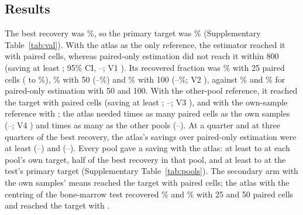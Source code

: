 \subsection*{Results}
The best recovery was \VlLevel\%, so the primary target was \VlTarget\% (Supplementary Table~\ref{tab:val}). With the atlas as the only reference, the estimator reached it with \VlCellsAtlas{} paired cells, whereas paired-only estimation did not reach it within 800 (saving at least \VlSaveAtlas; 95\% CI, \VlSaveAtlasLo--\VlSaveAtlasHi; V1 \VlVOne). Its recovered fraction was \VlRfAtlasTwentyFive\% with 25 paired cells (\VlRfAtlasTwentyFiveLo{} to \VlRfAtlasTwentyFiveHi\%), \VlRfAtlasFifty\% with 50 (\VlRfAtlasFiftyLo--\VlRfAtlasFiftyHi\%) and \VlRfAtlasHundred\% with 100 (\VlRfAtlasHundredLo--\VlRfAtlasHundredHi\%; V2 \VlVTwo), against \VlRfPairedFifty\% and \VlRfPairedHundred\% for paired-only estimation with 50 and 100. With the other-pool reference, it reached the target with \VlCellsOther{} paired cells (saving at least \VlSaveOther; \VlSaveOtherLo--\VlSaveOtherHi; V3 \VlVThree), and with the own-sample reference with \VlCellsOwn; the atlas needed \VlAtlasOverOwn{} times as many paired cells as the own samples (\VlAtlasOverOwnLo--\VlAtlasOverOwnHi; V4 \VlVFour) and \VlAtlasOverOther{} times as many as the other pools (\VlAtlasOverOtherLo--\VlAtlasOverOtherHi). At a quarter and at three quarters of the best recovery, the atlas's savings over paired-only estimation were at least \VlSaveAtlasQuarter{} (\VlSaveAtlasQuarterLo--\VlSaveAtlasQuarterHi) and \VlSaveAtlasThreeQ{} (\VlSaveAtlasThreeQLo--\VlSaveAtlasThreeQHi). Every pool gave a saving with the atlas: at least \VlPoolMin{} to \VlPoolMax{} at each pool's own target, half of the best recovery in that pool, and at least \RbPoolMin{} to \RbPoolMax{} at the test's primary target (Supplementary Table~\ref{tab:pools}). The secondary arm with the own samples' means reached the target with \VlCellsOwnPool{} paired cells; the atlas with the centring of the bone-marrow test recovered \VlRfDfTwentyFive\% and \VlRfDfFifty\% with 25 and 50 paired cells and reached the target with \VlCellsDf.

\begin{table}[h]
\caption{\textbf{Validation test: recovered fraction of within-cell-type dependence by reference.} Pooled over the \VlNFolds{} held-out samples; recovered fraction (\%) at each budget of paired cells, averaged over five draws, and paired cells needed to reach the primary target (\VlTarget\%, half of the best recovery), interpolated on the running maximum of each curve. Paired cells were centred within their populations by contrasts in every arm except the last two: own samples, their averages, centred on the population averages of the own-sample reference; atlas, centred as in bone marrow, centred on their own population averages with the factor $\sqrt{n/(n-1)}$ of the bone-marrow test.}
\label{tab:val}
\centering\footnotesize

\end{table}

